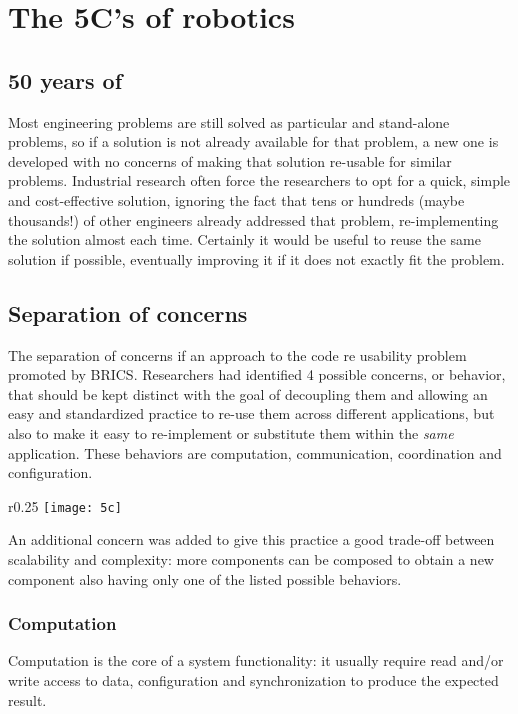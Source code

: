\chapter{The 5C's of robotics}

\label{ch:introduction} 
\section{50 years of }
Most engineering problems are still solved as particular and stand-alone problems, so if a solution is not already available for that problem, a new one is developed with no concerns of making that solution re-usable for similar problems. Industrial research often force the researchers to opt for a quick, simple and cost-effective solution, ignoring the fact that tens or hundreds (maybe thousands!) of other engineers already addressed that problem, re-implementing the solution almost each time. Certainly it would be useful to reuse the same solution if possible, eventually improving it if it does not exactly fit the problem.
\section{Separation of concerns}
The separation of concerns if an approach to the code re usability problem promoted by BRICS. Researchers had identified 4 possible concerns, or behavior, that should be kept distinct with the goal of decoupling them and allowing an easy and standardized practice to re-use them across different applications, but also to make it easy to re-implement or substitute them within the \emph{same} application. These behaviors are computation, communication, coordination and configuration\cite{brics}.
\begin{wrapfigure}{r}{0.25\textwidth} %
	\label{fig:fivec}
	\centering
	\texttt{[image: 5c]}
\end{wrapfigure}
An additional concern was added to give this practice a good trade-off between scalability and complexity: more components can be composed to obtain a new component also having only one of the listed possible behaviors.
\subsection{Computation}
Computation is the core of a system functionality: it usually require read and/or write access to data, configuration and synchronization to produce the expected result.
